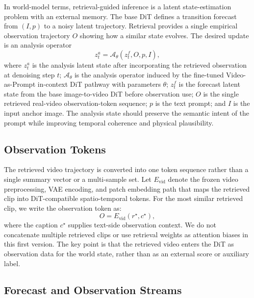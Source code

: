 \documentclass{article}
\begin{document}
In world-model terms, retrieval-guided inference is a latent state-estimation problem with an external memory. The base DiT defines a transition forecast from $(I,p)$ to a noisy latent trajectory. Retrieval provides a single empirical observation trajectory $O$ showing how a similar state evolves. The desired update is an analysis operator
\begin{equation}
    z_t^{a} = \mathcal{A}_{\theta}(z_t^{f}, O, p, I),
\end{equation}
where $z_t^{a}$ is the analysis latent state after incorporating the retrieved observation at denoising step $t$; $\mathcal{A}_{\theta}$ is the analysis operator induced by the fine-tuned Video-as-Prompt in-context DiT pathway with parameters $\theta$; $z_t^{f}$ is the forecast latent state from the base image-to-video DiT before observation use; $O$ is the single retrieved real-video observation-token sequence; $p$ is the text prompt; and $I$ is the input anchor image. The analysis state should preserve the semantic intent of the prompt while improving temporal coherence and physical plausibility.

\subsection{Observation Tokens}

The retrieved video trajectory is converted into one token sequence rather than a single summary vector or a multi-sample set. Let $E_{\mathrm{vid}}$ denote the frozen video preprocessing, VAE encoding, and patch embedding path that maps the retrieved clip into DiT-compatible spatio-temporal tokens. For the most similar retrieved clip, we write the observation token as:
\begin{equation}
    O = E_{\mathrm{vid}}(r^{\star}, c^{\star}),
\end{equation}
where the caption $c^{\star}$ supplies text-side observation context. We do not concatenate multiple retrieved clips or use retrieval weights as attention biases in this first version.
The key point is that the retrieved video enters the DiT as observation data for the world state, rather than as an external score or auxiliary label.

\subsection{Forecast and Observation Streams}
\end{document}
